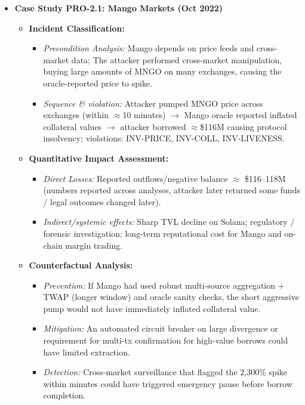 \begin{itemize}
    \item \textbf{Case Study PRO-2.1: Mango Markets (Oct 2022)}
        \begin{itemize}
            \item \textbf{Incident Classification:}
                \begin{itemize}
                    \item \textit{Precondition Analysis:} Mango depends on price feeds and cross-market data; The attacker performed cross-market manipulation, buying large amounts of MNGO on many exchanges, causing the oracle-reported price to spike.
                    \item \textit{Sequence \& violation:} Attacker pumped MNGO price across exchanges (within $\approx$10 minutes) $\rightarrow$ Mango oracle reported inflated collateral values $\rightarrow$ attacker borrowed $\approx$\$116M causing protocol insolvency; violations: INV-PRICE, INV-COLL, INV-LIVENESS.
                \end{itemize}
            \item \textbf{Quantitative Impact Assessment:}
                \begin{itemize}
                    \item \textit{Direct Losses:} Reported outflows/negative balance $\approx$ \$116--118M (numbers reported across analyses, attacker later returned some funds / legal outcomes changed later).
                    \item \textit{Indirect/systemic effects:} Sharp TVL decline on Solana; regulatory / forensic investigation; long-term reputational cost for Mango and on-chain margin trading.
                \end{itemize}
            \item \textbf{Counterfactual Analysis:}
                \begin{itemize}
                    \item \textit{Prevention:} If Mango had used robust multi-source aggregation + TWAP (longer window) and oracle sanity checks, the short aggressive pump would not have immediately inflated collateral value.
                    \item \textit{Mitigation:} An automated circuit breaker on large divergence or requirement for multi-tx confirmation for high-value borrows could have limited extraction.
                    \item \textit{Detection:} Cross-market surveillance that flagged the 2,300\% spike within minutes could have triggered emergency pause before borrow completion.

\end{itemize}
\end{itemize}
\end{itemize}
